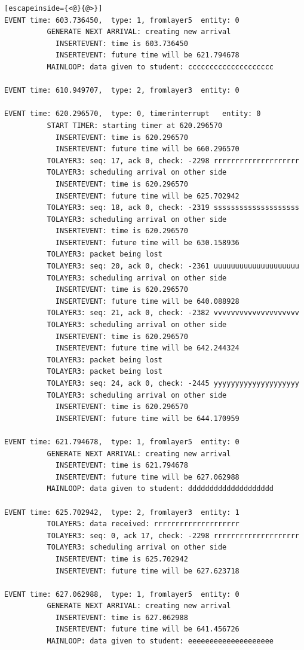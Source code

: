 \documentclass[paper=a4, fontsize=11pt]{scrartcl}
\numberwithin{equation}{section}		%
\numberwithin{figure}{section}			%
\numberwithin{table}{section}				%
\begin{document}
\begin{lstlisting}[escapeinside={<@}{@>}]
EVENT time: 603.736450,  type: 1, fromlayer5  entity: 0
          GENERATE NEXT ARRIVAL: creating new arrival
            INSERTEVENT: time is 603.736450
            INSERTEVENT: future time will be 621.794678
          MAINLOOP: data given to student: cccccccccccccccccccc

EVENT time: 610.949707,  type: 2, fromlayer3  entity: 0

EVENT time: 620.296570,  type: 0, timerinterrupt   entity: 0
          START TIMER: starting timer at 620.296570
            INSERTEVENT: time is 620.296570
            INSERTEVENT: future time will be 660.296570
          TOLAYER3: seq: 17, ack 0, check: -2298 rrrrrrrrrrrrrrrrrrrr
          TOLAYER3: scheduling arrival on other side
            INSERTEVENT: time is 620.296570
            INSERTEVENT: future time will be 625.702942
          TOLAYER3: seq: 18, ack 0, check: -2319 ssssssssssssssssssss
          TOLAYER3: scheduling arrival on other side
            INSERTEVENT: time is 620.296570
            INSERTEVENT: future time will be 630.158936
          TOLAYER3: packet being lost
          TOLAYER3: seq: 20, ack 0, check: -2361 uuuuuuuuuuuuuuuuuuuu
          TOLAYER3: scheduling arrival on other side
            INSERTEVENT: time is 620.296570
            INSERTEVENT: future time will be 640.088928
          TOLAYER3: seq: 21, ack 0, check: -2382 vvvvvvvvvvvvvvvvvvvv
          TOLAYER3: scheduling arrival on other side
            INSERTEVENT: time is 620.296570
            INSERTEVENT: future time will be 642.244324
          TOLAYER3: packet being lost
          TOLAYER3: packet being lost
          TOLAYER3: seq: 24, ack 0, check: -2445 yyyyyyyyyyyyyyyyyyyy
          TOLAYER3: scheduling arrival on other side
            INSERTEVENT: time is 620.296570
            INSERTEVENT: future time will be 644.170959

EVENT time: 621.794678,  type: 1, fromlayer5  entity: 0
          GENERATE NEXT ARRIVAL: creating new arrival
            INSERTEVENT: time is 621.794678
            INSERTEVENT: future time will be 627.062988
          MAINLOOP: data given to student: dddddddddddddddddddd

EVENT time: 625.702942,  type: 2, fromlayer3  entity: 1
          TOLAYER5: data received: rrrrrrrrrrrrrrrrrrrr
          TOLAYER3: seq: 0, ack 17, check: -2298 rrrrrrrrrrrrrrrrrrrr
          TOLAYER3: scheduling arrival on other side
            INSERTEVENT: time is 625.702942
            INSERTEVENT: future time will be 627.623718

EVENT time: 627.062988,  type: 1, fromlayer5  entity: 0
          GENERATE NEXT ARRIVAL: creating new arrival
            INSERTEVENT: time is 627.062988
            INSERTEVENT: future time will be 641.456726
          MAINLOOP: data given to student: eeeeeeeeeeeeeeeeeeee


\end{lstlisting}
\end{document}
